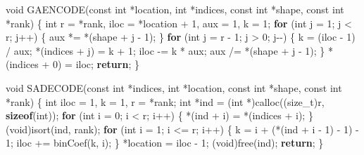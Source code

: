 \documentclass[
  12pt,
]{article}
\newenvironment{Shaded}{\begin{snugshade}}{\end{snugshade}}
\newcommand{\ControlFlowTok}[1]{\textcolor[rgb]{0.13,0.29,0.53}{\textbf{#1}}}
\newcommand{\DataTypeTok}[1]{\textcolor[rgb]{0.13,0.29,0.53}{#1}}
\newcommand{\DecValTok}[1]{\textcolor[rgb]{0.00,0.00,0.81}{#1}}
\newcommand{\KeywordTok}[1]{\textcolor[rgb]{0.13,0.29,0.53}{\textbf{#1}}}
\newcommand{\NormalTok}[1]{#1}
\begin{document}
\begin{Shaded}
\begin{Highlighting}[]
\DataTypeTok{void}\NormalTok{ GAENCODE(}\DataTypeTok{const} \DataTypeTok{int}\NormalTok{ *location, }\DataTypeTok{int}\NormalTok{ *indices, }\DataTypeTok{const} \DataTypeTok{int}\NormalTok{ *shape,}
              \DataTypeTok{const} \DataTypeTok{int}\NormalTok{ *rank) \{}
  \DataTypeTok{int}\NormalTok{ r = *rank, iloc = *location + }\DecValTok{1}\NormalTok{, aux = }\DecValTok{1}\NormalTok{, k = }\DecValTok{1}\NormalTok{;}
  \ControlFlowTok{for}\NormalTok{ (}\DataTypeTok{int}\NormalTok{ j = }\DecValTok{1}\NormalTok{; j \textless{} r; j++) \{}
\NormalTok{    aux *= *(shape + j {-} }\DecValTok{1}\NormalTok{);}
\NormalTok{  \}}
  \ControlFlowTok{for}\NormalTok{ (}\DataTypeTok{int}\NormalTok{ j = r {-} }\DecValTok{1}\NormalTok{; j \textgreater{} }\DecValTok{0}\NormalTok{; j{-}{-}) \{}
\NormalTok{    k = (iloc {-} }\DecValTok{1}\NormalTok{) / aux;}
\NormalTok{    *(indices + j) = k + }\DecValTok{1}\NormalTok{;}
\NormalTok{    iloc {-}= k * aux;}
\NormalTok{    aux /= *(shape + j {-} }\DecValTok{1}\NormalTok{);}
\NormalTok{  \}}
\NormalTok{  *(indices + }\DecValTok{0}\NormalTok{) = iloc;}
  \ControlFlowTok{return}\NormalTok{;}
\NormalTok{\}}

\DataTypeTok{void}\NormalTok{ SADECODE(}\DataTypeTok{const} \DataTypeTok{int}\NormalTok{ *indices, }\DataTypeTok{int}\NormalTok{ *location, }\DataTypeTok{const} \DataTypeTok{int}\NormalTok{ *shape,}
              \DataTypeTok{const} \DataTypeTok{int}\NormalTok{ *rank) \{}
  \DataTypeTok{int}\NormalTok{ iloc = }\DecValTok{1}\NormalTok{, k = }\DecValTok{1}\NormalTok{, r = *rank;}
  \DataTypeTok{int}\NormalTok{ *ind = (}\DataTypeTok{int}\NormalTok{ *)calloc((}\DataTypeTok{size\_t}\NormalTok{)r, }\KeywordTok{sizeof}\NormalTok{(}\DataTypeTok{int}\NormalTok{));}
  \ControlFlowTok{for}\NormalTok{ (}\DataTypeTok{int}\NormalTok{ i = }\DecValTok{0}\NormalTok{; i \textless{} r; i++) \{}
\NormalTok{    *(ind + i) = *(indices + i);}
\NormalTok{  \}}
\NormalTok{  (}\DataTypeTok{void}\NormalTok{)isort(ind, rank);}
  \ControlFlowTok{for}\NormalTok{ (}\DataTypeTok{int}\NormalTok{ i = }\DecValTok{1}\NormalTok{; i \textless{}= r; i++) \{}
\NormalTok{    k = i + (*(ind + i {-} }\DecValTok{1}\NormalTok{) {-} }\DecValTok{1}\NormalTok{) {-} }\DecValTok{1}\NormalTok{;}
\NormalTok{    iloc += binCoef(k, i);}
\NormalTok{  \}}
\NormalTok{  *location = iloc {-} }\DecValTok{1}\NormalTok{;}
\NormalTok{  (}\DataTypeTok{void}\NormalTok{)free(ind);}
  \ControlFlowTok{return}\NormalTok{;}
\NormalTok{\}}


\end{Highlighting}
\end{Shaded}
\end{document}
